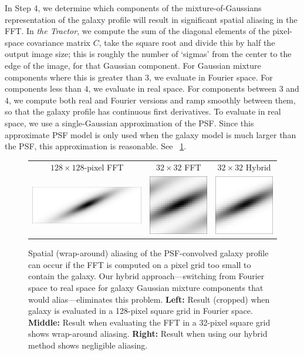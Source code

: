 \documentclass[11pt,letterpaper]{aastex63}
\newcommand{\figref}[1]{\figurename~\ref{#1}}
\newcommand{\project}[1]{\textsl{#1}}
\begin{document}
In Step 4, we determine which components of the mixture-of-Gaussians
representation of the galaxy profile will result in significant
spatial aliasing in the FFT.  In \project{the Tractor}, we compute the
sum of the diagonal elements of the pixel-space covariance matrix $C$,
take the square root and divide this by half the output image size;
this is roughly the number of `sigmas' from the center to the edge of
the image, for that Gaussian component.  For Gaussian mixture
components where this is greater than $3$, we evaluate in Fourier
space.  For components less than $4$, we evaluate in real space.  For
components between $3$ and $4$, we compute both real and Fourier
versions and ramp smoothly between them, so that the galaxy profile
has continuous first derivatives.  To evaluate in real space, we use a
single-Gaussian approximation of the PSF.  Since this approximate PSF
model is only used when the galaxy model is much larger than the PSF,
this approximation is reasonable.  See \figref{fig:wrap}.


\begin{figure}[htb]
\begin{center}
\begin{tabular}{@{}ccc@{}}
  $128 \times 128$-pixel FFT &
  $32 \times 32$ FFT &
  $32 \times 32$ Hybrid \\
  \includegraphics[height=0.19\textwidth]{gal-00} &
  \includegraphics[height=0.19\textwidth]{gal-01} &
  \includegraphics[height=0.19\textwidth]{gal-02} \\
\end{tabular}
\end{center}
\caption{\label{fig:wrap}%
  Spatial (wrap-around) aliasing of the PSF-convolved galaxy profile
  can occur if the FFT is
  computed on a pixel grid too small to contain the galaxy.
  Our hybrid approach---switching from Fourier space to real space
  for galaxy Gaussian mixture components that would alias---eliminates
  this problem.
  \textbf{Left:} Result (cropped) when galaxy is evaluated in a 128-pixel square grid in Fourier space.
  \textbf{Middle:} Result when evaluating the FFT in a 32-pixel square grid shows wrap-around
  aliasing.
  \textbf{Right:} Result when using our hybrid method shows negligible aliasing.
}
\end{figure}
\end{document}
